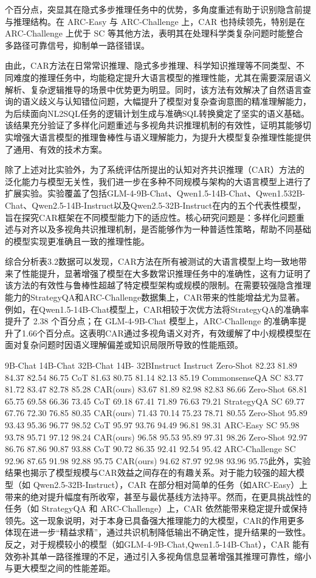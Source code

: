 \documentclass[12pt,a4paper,openright,UTF8]{ctexbook}
\begin{document}
个百分点，突显其在隐式多步推理任务中的优势，多角度重述有助于识别隐含前提与推理结构。在 ARC-Easy 与 ARC-Challenge 上，CAR 也持续领先，特别是在ARC-Challenge 上优于 SC 等其他方法，表明其在处理科学类复杂问题时能整合多路径可靠信号，抑制单一路径错误。


由此，CAR方法在日常常识推理、隐式多步推理、科学知识推理等不同类型、不同难度的推理任务中，均能稳定提升大语言模型的推理性能，尤其在需要深层语义解析、复杂逻辑推导的场景中优势更为明显。同时，该方法有效解决了自然语言查询的语义歧义与认知错位问题，大幅提升了模型对复杂查询意图的精准理解能力，为后续面向NL2SQL任务的逻辑计划生成与准确SQL转换奠定了坚实的语义基础。该结果充分验证了多样化问题重述与多视角共识推理机制的有效性，证明其能够切实增强大语言模型的推理鲁棒性与语义理解能力，为提升大模型复杂推理性能提供了通用、有效的技术方案。


除了上述对比实验外，为了系统评估所提出的认知对齐共识推理（CAR）方法的泛化能力与模型无关性，我们进一步在多种不同规模与架构的大语言模型上进行了扩展实验。实验覆盖了包括GLM-4-9B-Chat、Qwen1.5-14B-Chat、Qwen1.532B-Chat、Qwen2.5-14B-Instruct以及Qwen2.5-32B-Instruct在内的五个代表性模型，旨在探究CAR框架在不同模型能力下的适应性。核心研究问题是：多样化问题重述与对齐以及多视角共识推理机制，是否能够作为一种普适性策略，帮助不同基础的模型实现更准确且一致的推理性能。


综合分析表3.2数据可以发现，CAR方法在所有被测试的大语言模型上均一致地带来了性能提升，显著增强了模型在大多数常识推理任务中的准确性，这有力证明了该方法的有效性与鲁棒性超越了特定模型架构或规模的限制。在需要较强隐含推理能力的StrategyQA和ARC-Challenge数据集上，CAR带来的性能增益尤为显著。例如，在Qwen1.5-14B-Chat模型上，CAR相较于次优方法将StrategyQA的准确率提升了 2.38 个百分点；在 GLM-4-9B-Chat 模型上，ARC-Challenge 的准确率提升了1.66个百分点。这表明CAR通过多视角语义对齐，有效缓解了中小规模模型在面对复杂问题时因语义理解偏差或知识局限所导致的性能瓶颈。


9B-Chat 14B-Chat 32B-Chat 14B- 32BInstruct Instruct Zero-Shot 82.23 81.89 84.37 82.54 86.75 CoT 81.63 80.75 81.14 82.13 85.19 CommonsenseQA SC 83.77 81.72 83.47 82.78 85.28 CAR(ours) 83.67 81.89 82.98 82.83 86.66 Zero-Shot 68.81 65.75 69.58 66.36 73.45 CoT 69.18 67.41 71.89 76.63 79.21 StrategyQA SC 69.77 67.76 72.30 76.85 80.35 CAR(ours) 71.43 70.14 75.23 78.71 80.55 Zero-Shot 95.89 93.43 95.36 96.77 98.52 CoT 95.97 93.76 94.49 96.81 98.31 ARC-Easy SC 95.98 93.78 95.71 97.12 98.24 CAR(ours) 96.58 95.53 95.89 97.31 98.26 Zero-Shot 92.97 86.76 87.86 90.87 93.88 CoT 90.72 86.35 92.41 92.54 95.42 ARC-Challenge SC 92.96 87.65 91.98 92.88 95.75 CAR(ours) 94.62 87.97 92.98 93.96 95.75此外，实验结果也揭示了模型规模与CAR效益之间存在的有趣关系。对于能力较强的超大模型（如 Qwen2.5-32B-Instruct），CAR 在部分相对简单的任务（如ARC-Easy）上带来的绝对提升幅度有所收窄，甚至与最优基线方法持平。然而，在更具挑战性的任务（如 StrategyQA 和 ARC-Challenge）上，CAR 依然能带来稳定提升或保持领先。这一现象说明，对于本身已具备强大推理能力的大模型，CAR的作用更多体现在进一步“精益求精”，通过共识机制降低输出不确定性，提升结果的一致性。反之，对于规模较小的模型（如GLM-4-9B-Chat,Qwen1.5-14B-Chat），CAR 能有效弥补其单一路径推理的不足，通过引入多视角信息显著增强其推理可靠性，缩小与更大模型之间的性能差距。
\end{document}
